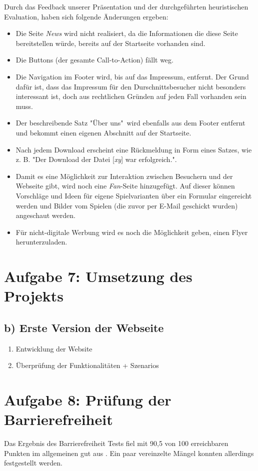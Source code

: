 \documentclass{scrartcl}
\begin{document}
Durch das Feedback unserer Präsentation und der durchgeführten heuristischen Evaluation, haben sich folgende Änderungen ergeben:
\begin{itemize}
\item Die Seite \textit{News} wird nicht realisiert, da die Informationen die diese Seite bereitstellen würde, bereits auf der Startseite vorhanden sind.
\item Die Buttons (der gesamte Call-to-Action) fällt weg.
\item Die Navigation im Footer wird, bis auf das Impressum, entfernt. Der Grund dafür ist, dass das Impressum für den Durschnittsbesucher nicht besonders interessant ist, doch aus rechtlichen Gründen auf jeden Fall vorhanden sein muss.
\item Der beschreibende Satz "Über uns"\ wird ebenfalls aus dem Footer entfernt und bekommt einen eigenen Abschnitt auf der Startseite.
\item Nach jedem Download erscheint eine Rückmeldung in Form eines Satzes, wie z. B. "Der Download der Datei [\textit{xy}] war erfolgreich.".
\item Damit es eine Möglichkeit zur Interaktion zwischen Besuchern und der Webseite gibt, wird noch eine \textit{Fan}-Seite hinzugefügt. Auf dieser können Vorschläge und Ideen für eigene Spielvarianten über ein Formular eingereicht werden und Bilder vom Spielen (die zuvor per E-Mail geschickt wurden) angeschaut werden.
\item Für nicht-digitale Werbung wird es noch die Möglichkeit geben, einen Flyer herunterzuladen.
\end{itemize}

\section*{Aufgabe 7: Umsetzung des Projekts}
\subsection*{b) Erste Version der Webseite}
\begin{enumerate}
\item Entwicklung der Website
\item Überprüfung der Funktionalitäten + Szenarios
\end{enumerate}
\section*{Aufgabe 8: Prüfung der Barrierefreiheit}
Das Ergebnis des Barrierefreiheit Tests fiel mit 90,5 von 100 erreichbaren Punkten im allgemeinen gut aus . Ein paar vereinzelte Mängel konnten allerdings festgestellt werden.
\end{document}
